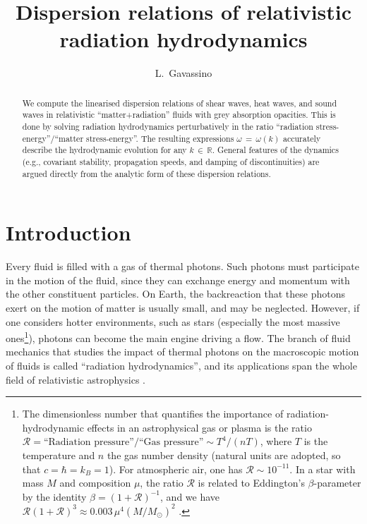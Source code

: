 \documentclass[a4paper, amsfonts, amssymb, amsmath, reprint, showkeys, nofootinbib, twoside,notitlepage,onecolumn]{revtex4-2}
\theoremstyle{definition}
\theoremstyle{theorem}
\theoremstyle{corollary}
\begin{document}
\title{Dispersion relations of relativistic radiation hydrodynamics}
\author{ L.~Gavassino}


\begin{abstract}
We compute the linearised dispersion relations of shear waves, heat waves, and sound waves in relativistic ``matter+radiation'' fluids with grey absorption opacities. This is done by solving radiation hydrodynamics perturbatively in the ratio ``radiation stress-energy''/``matter stress-energy''. The resulting expressions $\omega \, {=} \, \omega(k)$ accurately describe the hydrodynamic evolution for any $k\, {\in}\, \mathbb{R}$. General features of the dynamics (e.g., covariant stability, propagation speeds, and damping of discontinuities) are argued directly from the analytic form of these dispersion relations.
\end{abstract} 





\maketitle


\section{Introduction}\label{Introne}
\vspace{-0.2cm}

Every fluid is filled with a gas of thermal photons. Such photons must participate in the motion of the fluid, since they can exchange energy and momentum with the other constituent particles. On Earth, the backreaction that these photons exert on the motion of matter is usually small, and may be neglected. However, if one considers hotter environments, such as stars (especially the most massive ones\footnote{\label{footnes1}The dimensionless number that quantifies the importance of radiation-hydrodynamic effects in an astrophysical gas or plasma is the ratio $\mathcal{R}=\text{``Radiation pressure''}/\text{``Gas pressure''} \sim T^4/(nT)$, where $T$ is the temperature and $n$ the gas number density (natural units are adopted, so that $c{=}\hbar{=}k_B{=}1$). For atmospheric air, one has $\mathcal{R}\sim 10^{-11}$. In a star with mass $M$ and composition $\mu$, the ratio $\mathcal{R}$ is related to Eddington's $\beta$-parameter by the identity $\beta=(1{+}\mathcal{R})^{-1}$, and we have $\mathcal{R}(1{+}\mathcal{R})^3  \approx 0.003 \, \mu^4 (M/M_\odot)^2$ \cite[\S 5.6]{Prialnik2009}.}), photons can become the main engine driving a flow. The branch of fluid mechanics that studies the impact of thermal photons on the macroscopic motion of fluids is called ``radiation hydrodynamics'', and its applications span the whole field of relativistic astrophysics \cite{Pomraning1973,mihalas_book,CastorRadiationBook_2004,Thomas1930,Weinberg1971,UdeyIsrael1982,Thorne1981,AnileRadiazion1992,Farris2008,Sadowski2013}.
\end{document}

